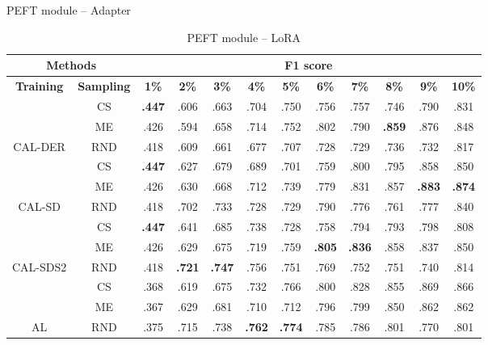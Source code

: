 \begin{table}[htbp]
\centering
\begin{subtable}{\linewidth}
\centering
\caption{PEFT module -- Adapter}

\begin{tabular}{c|c|cccccccccc}
\toprule
\multicolumn{2}{c|}{\textbf{Methods}} & \multicolumn{10}{c}{\textbf{F1 score}} \\
\midrule
\textbf{Training} & \textbf{Sampling} & \textbf{1\%} & \textbf{2\%} & \textbf{3\%} & \textbf{4\%} & \textbf{5\%} & \textbf{6\%} & \textbf{7\%} & \textbf{8\%} & \textbf{9\%} & \textbf{10\%}\\
\midrule
 & CS & \textbf{.447} & .606 & .663 & .704 & .750 & .756 & .757 & .746 & .790 & .831\\

 & ME & .426 & .594 & .658 & .714 & .752 & .802 & .790 & \textbf{.859} & .876 & .848\\

\multirow{-3}{*}{\raggedright\arraybackslash CAL-DER} & RND & .418 & .609 & .661 & .677 & .707 & .728 & .729 & .736 & .732 & .817\\
\midrule
 & CS & \textbf{.447} & .627 & .679 & .689 & .701 & .759 & .800 & .795 & .858 & .850\\

 & ME & .426 & .630 & .668 & .712 & .739 & .779 & .831 & .857 & \textbf{.883} & \textbf{.874}\\

\multirow{-3}{*}{\raggedright\arraybackslash CAL-SD} & RND & .418 & .702 & .733 & .728 & .729 & .790 & .776 & .761 & .777 & .840\\
\midrule
 & CS & \textbf{.447} & .641 & .685 & .738 & .728 & .758 & .794 & .793 & .798 & .808\\

 & ME & .426 & .629 & .675 & .719 & .759 & \textbf{.805} & \textbf{.836} & .858 & .837 & .850\\

\multirow{-3}{*}{\raggedright\arraybackslash CAL-SDS2} & RND & .418 & \textbf{.721} & \textbf{.747} & .756 & .751 & .769 & .752 & .751 & .740 & .814\\
\midrule
 & CS & .368 & .619 & .675 & .732 & .766 & .800 & .828 & .855 & .869 & .866\\

 & ME & .367 & .629 & .681 & .710 & .712 & .796 & .799 & .850 & .862 & .862\\

\multirow{-3}{*}{\raggedright\arraybackslash AL} & RND & .375 & .715 & .738 & \textbf{.762} & \textbf{.774} & .785 & .786 & .801 & .770 & .801\\
\bottomrule
\end{tabular}
\end{subtable}
\vspace{1em}
\begin{subtable}{\linewidth}
\centering
\caption{PEFT module -- LoRA}


\end{subtable}
\end{table}
